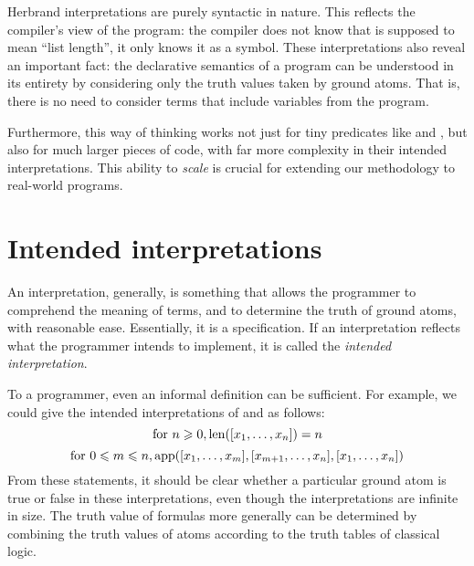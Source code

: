 Herbrand interpretations are purely syntactic in nature.
This reflects the compiler's view of the program:
the compiler does not know that 
is supposed to mean ``list length'',
it only knows it as a symbol.
These interpretations also reveal an important fact:
the declarative semantics of a program
can be understood in its entirety
by considering only the truth values taken by ground atoms.
That is, there is no need to consider terms that include
variables from the program.

Furthermore,
this way of thinking works not just for tiny predicates
like  and ,
but also for much larger pieces of code,
with far more complexity in their intended interpretations.
This ability to \emph{scale} is crucial for
extending our methodology to real-world programs.


\section{Intended interpretations}
\label{sec:intended-interp}

An interpretation\label{gi:interpretation}, generally,
is something that allows the programmer
to comprehend the meaning of terms,
and to determine the truth of ground atoms,
with reasonable ease.
Essentially, it is a specification.
If an interpretation reflects what the programmer intends to implement,
it is called the
\emph{intended interpretation\label{gi:intended-interpretation}}.

To a programmer, even an informal definition can be sufficient.
For example, we could give the intended interpretations
of  and  as follows:
\[
\text{for } n \geqslant 0, \operatorname{len}([x_1, \ldots, x_n]) = n
\]
\[
\text{for } 0 \leqslant m \leqslant n,
\operatorname{app}([x_1, \ldots, x_m], [x_{m+1}, \ldots, x_n], [x_1, \ldots, x_n])
\]
From these statements,
it should be clear whether a particular ground atom
is true or false in these interpretations,
even though the interpretations are infinite in size.
The truth value of formulas more generally
can be determined by combining the truth values of atoms
according to the truth tables of classical logic.

